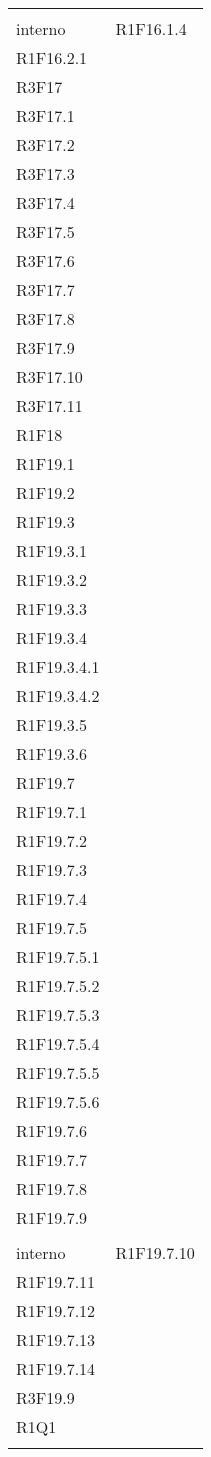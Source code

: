 \begin{longtable}{ >{\centering}p{}
		>{\centering}p{}}
	\tabularnewline \rowcolorlight &	\tabularnewline
	interno & R1F16.1.4 \\R1F16.2.1 \\R3F17 \\R3F17.1 \\ R3F17.2 \\R3F17.3 \\R3F17.4 \\R3F17.5 \\R3F17.6 \\R3F17.7 \\R3F17.8 \\R3F17.9 \\R3F17.10 \\R3F17.11 \\R1F18 \\R1F19.1 \\R1F19.2 \\R1F19.3 \\R1F19.3.1 \\R1F19.3.2 \\R1F19.3.3 \\R1F19.3.4 \\R1F19.3.4.1 \\R1F19.3.4.2 \\R1F19.3.5 \\R1F19.3.6 \\R1F19.7 \\R1F19.7.1 \\R1F19.7.2 \\R1F19.7.3 \\R1F19.7.4 \\R1F19.7.5 \\R1F19.7.5.1 \\R1F19.7.5.2 \\R1F19.7.5.3 \\R1F19.7.5.4 \\R1F19.7.5.5 \\R1F19.7.5.6 \\R1F19.7.6 \\R1F19.7.7 \\R1F19.7.8 \\ R1F19.7.9 
		\tabularnewline \rowcolorlight &	\tabularnewline
		interno &  R1F19.7.10 \\R1F19.7.11\\R1F19.7.12\\R1F19.7.13 \\R1F19.7.14 \\R3F19.9 \\R1Q1 \\\tabularnewline
	

\end{longtable}
